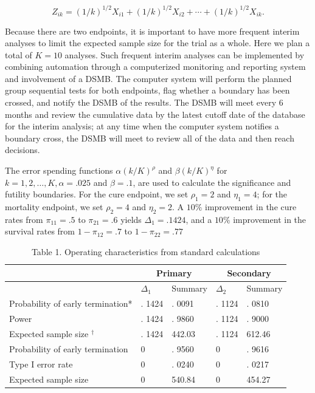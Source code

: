 \documentclass[10pt]{article}
\begin{document}
\begin{equation*}
Z_{i k}=(1 / k)^{1 / 2} X_{i 1}+(1 / k)^{1 / 2} X_{i 2}+\cdots+(1 / k)^{1 / 2} X_{i k} . \tag{15}
\end{equation*}


Because there are two endpoints, it is important to have more frequent interim analyses to limit the expected sample size for the trial as a whole. Here we plan a total of $K=10$ analyses. Such frequent interim analyses can be implemented by combining automation through a computerized monitoring and reporting system and involvement of a DSMB. The computer system will perform the planned group sequential tests for both endpoints, flag whether a boundary has been crossed, and notify the DSMB of the results. The DSMB will meet every 6 months and review the cumulative data by the latest cutoff date of the database for the interim analysis; at any time when the computer system notifies a boundary cross, the DSMB will meet to review all of the data and then reach decisions.

The error spending functions $\alpha(k / K)^{\rho}$ and $\beta(k / K)^{\eta}$ for $k=1,2, \ldots, K, \alpha=.025$ and $\beta=.1$, are used to calculate the significance and futility boundaries. For the cure endpoint, we set $\rho_{1}=2$ and $\eta_{1}=4$; for the mortality endpoint, we set $\rho_{2}=4$ and $\eta_{2}=2$. A $10 \%$ improvement in the cure rates from $\pi_{11}=.5$ to $\pi_{21}=.6$ yields $\Delta_{1}=.1424$, and a $10 \%$ improvement in the survival rates from $1-\pi_{12}=.7$ to $1-\pi_{22}=.77$

\begin{table}[h]
\begin{center}
\captionsetup{labelformat=empty}
\caption{Table 1. Operating characteristics from standard calculations}
\begin{tabular}[t]{|l|l|l|l|l|}
\hline
\multirow{2}{*}{} & \multicolumn{2}{|c|}{Primary} & \multicolumn{2}{|c|}{Secondary} \\
\hline
 & $\Delta_{1}$ & Summary & $\Delta_{2}$ & Summary \\
\hline
Probability of early termination* & . 1424 & . 0091 & . 1124 & . 0810 \\
\hline
Power & . 1424 & . 9860 & . 1124 & . 9000 \\
\hline
Expected sample size ${ }^{\dagger}$ & . 1424 & 442.03 & . 1124 & 612.46 \\
\hline
Probability of early termination & 0 & . 9560 & 0 & . 9616 \\
\hline
Type I error rate & 0 & . 0240 & 0 & . 0217 \\
\hline
Expected sample size & 0 & 540.84 & 0 & 454.27 \\
\hline
\end{tabular}
\end{center}
\end{table}
\end{document}
